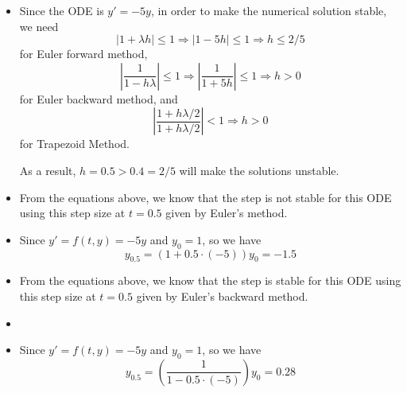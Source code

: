 \documentclass[11pt]{article}
\begin{document}
	\begin{itemize}
		\item Since the ODE is $y' = -5y$, in order to make the numerical solution stable, we need
		\[|1 + \lambda h| \leq 1 \Rightarrow |1 - 5h| \leq 1 \Rightarrow h \leq 2 /5\]
		for Euler forward method,
		\[\left|\frac{1}{1 - h\lambda}\right| \leq 1 \Rightarrow \left|\frac{1}{1 + 5h}\right| \leq 1 \Rightarrow h > 0\]
		for Euler backward method,
		and \[\left|\frac{1 + h\lambda/2}{1 + h\lambda/2}\right| < 1 \Rightarrow h > 0\]
		for Trapezoid Method.
		
		As a result, $h = 0.5 > 0.4 = 2 / 5$ will make the solutions unstable.
		
		\item From the equations above, we know that the step is not stable for this ODE using this step size at $t=0.5$ given by Euler's method.
		\item Since $y' = f(t, y) = -5y$ and $y_0 = 1$, so we have 
		\[y_{0.5} = (1 + 0.5 \cdot (-5))y_0 = -1.5\]
		
		\item From the equations above, we know that the step is stable for this ODE using this step size at $t=0.5$ given by Euler's backward method.
		\item \item Since $y' = f(t, y) = -5y$ and $y_0 = 1$, so we have
		\[y_{0.5} = \left(\frac{1}{1 - 0.5 \cdot (-5)}\right)y_0 = 0.28\]
	\end{itemize}
\end{document}
